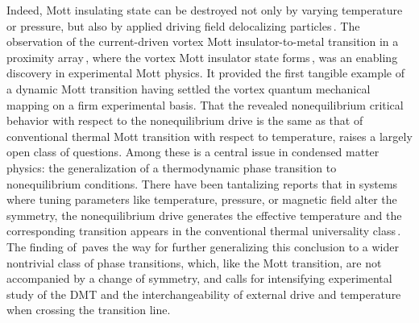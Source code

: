 \documentclass[aps,twocolumn,prl,10pt,amsmath,amssymb,nofootinbib,showpacs,superscriptaddress,floatfix]{revtex4-1}
\begin{document}
Indeed, Mott insulating state can be destroyed not only by varying temperature or pressure, but
also by applied driving field delocalizing particles\,\cite{Imada:1998,Balents:2005,Sachdev:book,Quantum:2012,Lee:2006}.    The observation of the current-driven vortex Mott insulator-to-metal  transition in a proximity array\,\cite{Science2015}, where the vortex Mott insulator state forms\,\cite{Nelson,Nelson:1998}, was an enabling discovery in experimental Mott physics. It provided the first tangible
example of a dynamic Mott transition having settled the vortex quantum mechanical mapping on a firm experimental basis. 
That the revealed nonequilibrium critical behavior with respect to the nonequilibrium drive is the same as that of conventional thermal Mott transition with respect to temperature, raises a largely open class of questions. 
Among these is a central issue in condensed matter physics: the generalization of a thermodynamic phase transition to nonequilibrium conditions.  There have been tantalizing reports that in systems where tuning parameters like temperature, pressure, or magnetic field alter the symmetry, the nonequilibrium drive generates the effective temperature and the corresponding transition appears in the conventional thermal universality class\,\cite{Millis:2006,Chtchelk:2009}.
The finding of\,\cite{Science2015} paves the way for further generalizing this conclusion to a wider nontrivial class of phase transitions, which, like the Mott transition, are not accompanied by a change of symmetry, and calls for intensifying experimental study of the DMT and the interchangeability of external drive and temperature when crossing the transition line.
\end{document}
